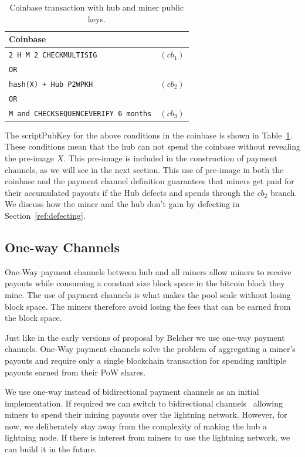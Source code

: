 \documentclass{article}
\begin{document}
\begin{table}
  \centering
  \begin{tabular}{ lr }
    \bfseries Coinbase \\
    \midrule
    \verb|2 H M 2 CHECKMULTISIG| & $(cb_1)$ \\
    \verb|OR| \\
    \verb|hash(X) + Hub P2WPKH| & $(cb_2)$ \\
    \verb|OR| \\
    \verb|M and CHECKSEQUENCEVERIFY 6 months| & $(cb_3)$\\ 
    \midrule
  \end{tabular}
  \caption{Coinbase transaction with hub and miner public keys.}\label{table:coinbase}
\end{table}

The scriptPubKey for the above conditions in the coinbase is shown in
Table~\ref{table:coinbase}. These conditions mean that the hub can not
spend the coinbase without revealing the pre-image $X$. This pre-image
is included in the construction of payment channels, as we will see in
the next section. This use of pre-image in both the coinbase and the
payment channel definition guarantees that miners get paid for their
accumulated payouts if the Hub defects and spends through the $cb_2$
branch. We discuss how the miner and the hub don't gain by defecting
in Section~\ref{ref:defecting}.

\subsection{One-way Channels}

One-Way payment channels between hub and all miners allow miners to
receive payouts while consuming a constant size block space in the
bitcoin block they mine. The use of payment channels is what makes the
pool scale without losing block space. The miners therefore avoid
losing the fees that can be earned from the block space.

Just like in the early versions of proposal by Belcher we use one-way
payment channels. One-Way payment channels solve the problem of
aggregating a miner's payouts and require only a single blockchain
transaction for spending multiple payouts earned from their PoW
shares.

We use one-way instead of bidirectional payment channels as an initial
implementation. If required we can switch to bidirectional
channels~\cite{poon2016bitcoin} allowing miners to spend their mining
payouts over the lightning network. However, for now, we deliberately
stay away from the complexity of making the hub a lightning node. If
there is interest from miners to use the lightning network, we can
build it in the future.
\end{document}
